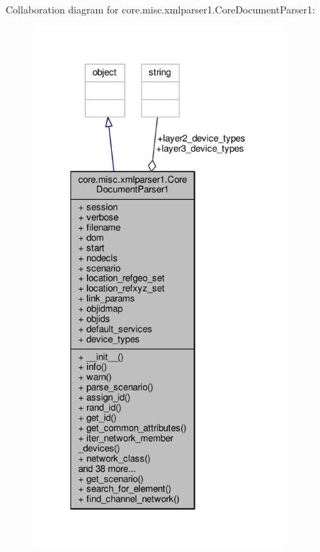 Collaboration diagram for core.\+misc.\+xmlparser1.\+Core\+Document\+Parser1\+:
\nopagebreak
\begin{figure}[H]
\begin{center}
\leavevmode
\includegraphics[height=550pt]{classcore_1_1misc_1_1xmlparser1_1_1_core_document_parser1__coll__graph}
\end{center}
\end{figure}
